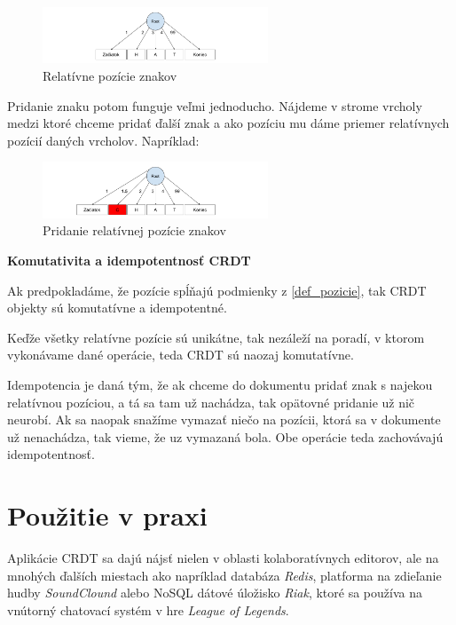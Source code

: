 \begin{figure}[H]
\centerline{\includegraphics[width=0.6\textwidth]{images/relativne_pozicie1}}
\caption[Relatívne pozície znakov]{Relatívne pozície znakov}
\label{obr:relativne}
\end{figure}

Pridanie znaku potom funguje veľmi jednoducho. Nájdeme v strome vrcholy medzi ktoré
chceme pridať ďalší znak a ako pozíciu mu dáme priemer relatívnych pozícií daných
vrcholov. Napríklad:
\begin{figure}[H]
\centerline{\includegraphics[width=0.6\textwidth]{images/relativne_pozicie2}}
\caption[Pridanie relatívnej pozície znakov]{Pridanie relatívnej pozície znakov}
\label{obr:relativne_pridanie}
\end{figure}

\begin{flushleft}\textbf {Komutativita a idempotentnosť CRDT}\end{flushleft}
Ak predpokladáme, že pozície spĺňajú podmienky z \ref{def_pozicie}, tak CRDT objekty sú
komutatívne a idempotentné. 

Keďže všetky relatívne pozície sú unikátne, tak nezáleží na poradí, v ktorom vykonávame dané operácie,
teda CRDT sú naozaj komutatívne.

Idempotencia je daná tým, že ak chceme do dokumentu pridať znak s najekou relatívnou pozíciou, a tá
sa tam už nachádza, tak opätovné pridanie už nič neurobí. Ak sa naopak snažíme vymazať niečo na
pozícii, ktorá sa v dokumente už nenachádza, tak vieme, že uz vymazaná bola. Obe operácie teda
zachovávajú idempotentnosť.
\cite{nuno_preguica}

\section{Použitie v praxi}
Aplikácie CRDT sa dajú nájsť nielen v oblasti kolaboratívnych editorov, ale na mnohých ďalších
miestach ako napríklad databáza \textit{Redis}, platforma na zdieľanie hudby \textit{SoundClound}
alebo NoSQL 
dátové úložisko \textit{Riak}, ktoré sa používa na vnútorný chatovací systém v hre 
\textit{League of Legends}.
\cite{crdt_wiki}


